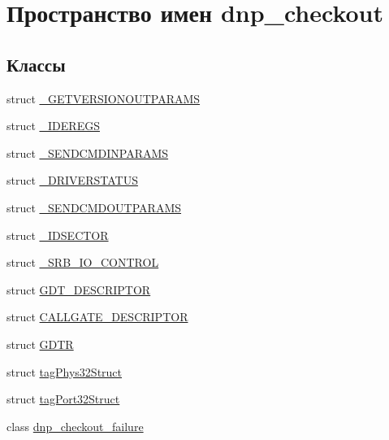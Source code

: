 \hypertarget{namespacednp__checkout}{\section{Пространство имен dnp\-\_\-checkout}
\label{namespacednp__checkout}
}
\subsection*{Классы}
\begin{DoxyCompactItemize}
\item 
struct \hyperlink{structdnp__checkout_1_1___g_e_t_v_e_r_s_i_o_n_o_u_t_p_a_r_a_m_s}{\-\_\-\-G\-E\-T\-V\-E\-R\-S\-I\-O\-N\-O\-U\-T\-P\-A\-R\-A\-M\-S}
\item 
struct \hyperlink{structdnp__checkout_1_1___i_d_e_r_e_g_s}{\-\_\-\-I\-D\-E\-R\-E\-G\-S}
\item 
struct \hyperlink{structdnp__checkout_1_1___s_e_n_d_c_m_d_i_n_p_a_r_a_m_s}{\-\_\-\-S\-E\-N\-D\-C\-M\-D\-I\-N\-P\-A\-R\-A\-M\-S}
\item 
struct \hyperlink{structdnp__checkout_1_1___d_r_i_v_e_r_s_t_a_t_u_s}{\-\_\-\-D\-R\-I\-V\-E\-R\-S\-T\-A\-T\-U\-S}
\item 
struct \hyperlink{structdnp__checkout_1_1___s_e_n_d_c_m_d_o_u_t_p_a_r_a_m_s}{\-\_\-\-S\-E\-N\-D\-C\-M\-D\-O\-U\-T\-P\-A\-R\-A\-M\-S}
\item 
struct \hyperlink{structdnp__checkout_1_1___i_d_s_e_c_t_o_r}{\-\_\-\-I\-D\-S\-E\-C\-T\-O\-R}
\item 
struct \hyperlink{structdnp__checkout_1_1___s_r_b___i_o___c_o_n_t_r_o_l}{\-\_\-\-S\-R\-B\-\_\-\-I\-O\-\_\-\-C\-O\-N\-T\-R\-O\-L}
\item 
struct \hyperlink{structdnp__checkout_1_1_g_d_t___d_e_s_c_r_i_p_t_o_r}{G\-D\-T\-\_\-\-D\-E\-S\-C\-R\-I\-P\-T\-O\-R}
\item 
struct \hyperlink{structdnp__checkout_1_1_c_a_l_l_g_a_t_e___d_e_s_c_r_i_p_t_o_r}{C\-A\-L\-L\-G\-A\-T\-E\-\_\-\-D\-E\-S\-C\-R\-I\-P\-T\-O\-R}
\item 
struct \hyperlink{structdnp__checkout_1_1_g_d_t_r}{G\-D\-T\-R}
\item 
struct \hyperlink{structdnp__checkout_1_1tag_phys32_struct}{tag\-Phys32\-Struct}
\item 
struct \hyperlink{structdnp__checkout_1_1tag_port32_struct}{tag\-Port32\-Struct}
\item 
class \hyperlink{classdnp__checkout_1_1dnp__checkout__failure}{dnp\-\_\-checkout\-\_\-failure}
\end{DoxyCompactItemize}
